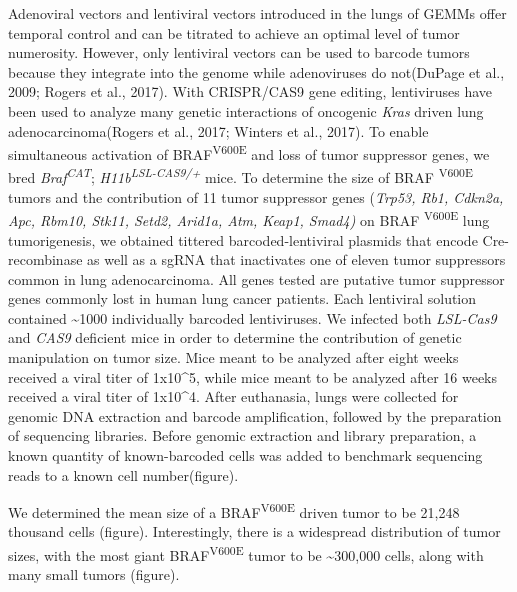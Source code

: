 Adenoviral vectors and lentiviral vectors introduced in the lungs of GEMMs offer temporal control and can be titrated to achieve an optimal level of tumor numerosity.
However, only lentiviral vectors can be used to barcode tumors because they integrate into the genome while adenoviruses do not(DuPage et al., 2009; Rogers et al., 2017).
With CRISPR/CAS9 gene editing, lentiviruses have been used to analyze many genetic interactions of oncogenic \emph{Kras} driven lung adenocarcinoma(Rogers et al., 2017; Winters et al., 2017).
To enable simultaneous activation of BRAF\textsuperscript{V600E} and loss of tumor suppressor genes, we bred \emph{Braf\textsuperscript{CAT}}; \emph{H11b\textsuperscript{LSL-CAS9/+}} mice.
To determine the size of BRAF \textsuperscript{V600E} tumors and the contribution of 11 tumor suppressor genes (\emph{Trp53, Rb1, Cdkn2a, Apc, Rbm10, Stk11, Setd2, Arid1a, Atm, Keap1, Smad4)} on BRAF \textsuperscript{V600E} lung tumorigenesis, we obtained tittered barcoded-lentiviral plasmids that encode Cre-recombinase as well as a sgRNA that inactivates one of eleven tumor suppressors common in lung adenocarcinoma.
All genes tested are putative tumor suppressor genes commonly lost in human lung cancer patients. Each lentiviral solution contained \textasciitilde1000 individually barcoded lentiviruses.
We infected both \emph{LSL-Cas9} and \emph{CAS9} deficient mice in order to determine the contribution of genetic manipulation on tumor size.
Mice meant to be analyzed after eight weeks received a viral titer of 1x10\^{}5, while mice meant to be analyzed after 16 weeks received a viral titer of 1x10\^{}4. After euthanasia, lungs were collected for genomic DNA extraction and barcode amplification, followed by the preparation of sequencing libraries.
Before genomic extraction and library preparation, a known quantity of known-barcoded cells was added to benchmark sequencing reads to a known cell number(figure).

We determined the mean size of a BRAF\textsuperscript{V600E} driven tumor to be 21,248 thousand cells (figure).
Interestingly, there is a widespread distribution of tumor sizes, with the most giant BRAF\textsuperscript{V600E} tumor to be \textasciitilde300,000 cells, along with many small tumors (figure).

